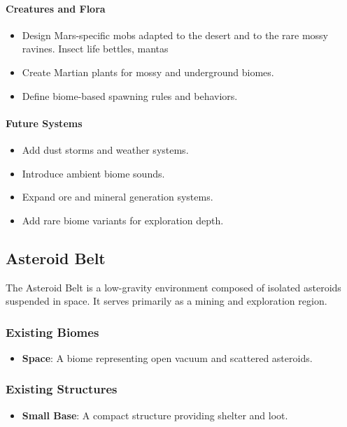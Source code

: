 \documentclass{article}
\begin{document}
\paragraph{Creatures and Flora}
\begin{itemize}
    \item Design Mars-specific mobs adapted to the desert and to the rare mossy ravines. Insect life bettles, mantas
    \item Create Martian plants for mossy and underground biomes.
    \item Define biome-based spawning rules and behaviors.
\end{itemize}

\paragraph{Future Systems}
\begin{itemize}
    \item Add dust storms and weather systems.
    \item Introduce ambient biome sounds.
    \item Expand ore and mineral generation systems.
    \item Add rare biome variants for exploration depth.
\end{itemize}

\subsection{Asteroid Belt}

The Asteroid Belt is a low-gravity environment composed of isolated asteroids suspended in space. It serves primarily as a mining and exploration region.

\subsubsection{Existing Biomes}

\begin{itemize}
    \item \textbf{Space}: A biome representing open vacuum and scattered asteroids.
\end{itemize}

\subsubsection{Existing Structures}

\begin{itemize}
    \item \textbf{Small Base}: A compact structure providing shelter and loot.
\end{itemize}
\end{document}
